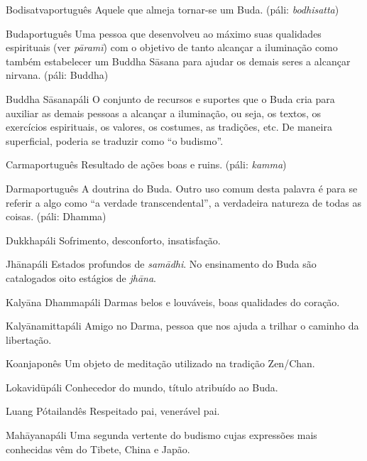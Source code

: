 \begin{glossarydescription}
  \item[{{Bodisatva}{português}}] Aquele que almeja tornar-se um Buda. (páli: \emph{bodhisatta})

  \item[{{Buda}{português}}] Uma pessoa que desenvolveu ao máximo suas qualidades espirituais (ver \emph{pāramī}) com o objetivo de tanto alcançar a iluminação como também estabelecer um Buddha Sāsana para ajudar os demais seres a alcançar nirvana. (páli: Buddha)

  \item[{{Buddha Sāsana}{páli}}] O conjunto de recursos e suportes que o Buda cria para auxiliar as demais pessoas a alcançar a iluminação, ou seja, os textos, os exercícios espirituais, os valores, os costumes, as tradições, etc. De maneira superficial, poderia se traduzir como “o budismo”.

  \item[{{Carma}{português}}] Resultado de ações boas e ruins. (páli: \emph{kamma})

  \item[{{Darma}{português}}] A doutrina do Buda. Outro uso comum desta palavra é para se referir a algo como “a verdade transcendental”, a verdadeira natureza de todas as coisas. (páli: Dhamma)

  \item[{{Dukkha}{páli}}] Sofrimento, desconforto, insatisfação.

  \item[{{Jhāna}{páli}}] Estados profundos de \emph{samādhi}. No ensinamento do Buda são catalogados oito estágios de \emph{jhāna}.

  \item[{{Kalyāna Dhamma}{páli}}] Darmas belos e louváveis, boas qualidades do coração.

  \item[{{Kalyānamitta}{páli}}] Amigo no Darma, pessoa que nos ajuda a trilhar o caminho da libertação.

  \item[{{Koan}{japonês}}] Um objeto de meditação utilizado na tradição Zen/Chan.

  \item[{{Lokavidū}{páli}}] Conhecedor do mundo, título atribuído ao Buda.

  \item[{{Luang Pó}{tailandês}}] Respeitado pai, venerável pai.

  \item[{{Mahāyana}{páli}}] Uma segunda vertente do budismo cujas expressões mais conhecidas vêm do Tibete, China e Japão.


\end{glossarydescription}
